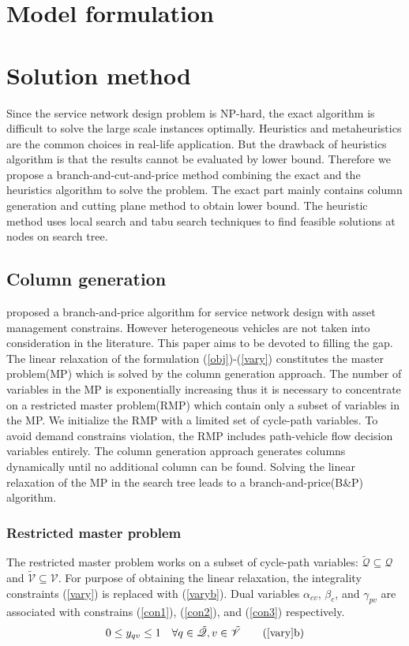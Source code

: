 \documentclass[11pt,nonblindrev,fleqn]{article}
\begin{document}
\section{Model formulation}

\section{Solution method}
Since the service network design problem is NP-hard, the exact algorithm is difficult to solve the large scale instances optimally. Heuristics and metaheuristics are the common choices in real-life application. But the drawback of heuristics algorithm is that the results cannot be evaluated by lower bound. Therefore we propose a branch-and-cut-and-price method combining the exact and the heuristics algorithm to solve the problem. The exact part mainly contains column generation and cutting plane method to obtain lower bound. The heuristic method uses local search and tabu search techniques to find feasible solutions at nodes on search tree.
\subsection{Column generation}
\cite{Andersen2011Branch} proposed a branch-and-price algorithm for service network design with asset management constrains. However heterogeneous vehicles are not taken into consideration in the literature. This paper aims to be devoted to filling the gap.
The linear relaxation of the formulation (\ref{obj})-(\ref{vary}) constitutes the master problem(MP) which is solved by the column generation approach. The number of variables in the MP is exponentially increasing thus it is necessary to concentrate on a restricted master problem(RMP) which contain only a subset of variables in the MP. We initialize the RMP with a limited set of cycle-path variables. To avoid demand constrains violation, the RMP includes path-vehicle flow decision variables entirely. The column generation approach generates columns dynamically until no additional column can be found. Solving the linear relaxation of the MP in the search tree leads to a branch-and-price(B\&P) algorithm.
\subsubsection{Restricted master problem}
The restricted master problem works on a subset of cycle-path variables: $\tilde{\mathscr{Q}}\subseteq \mathscr{Q}$ and $\tilde{\mathscr{V}}\subseteq \mathscr{V}$. For purpose of obtaining the linear relaxation, the integrality constraints (\ref{vary}) is replaced with (\ref{varyb}). Dual variables $\alpha_{cv}$, $\beta_c$, and $\gamma_{pv}$ are associated with constrains (\ref{con1}), (\ref{con2}), and (\ref{con3}) respectively.
\begin{equation}\label{varyb}
0\leq y_{qv} \leq 1   \quad  \forall q\in\tilde{\mathscr{Q}}, v\in\tilde{\mathscr{V}} \tag{\ref{vary}b}
\end{equation}
\end{document}
